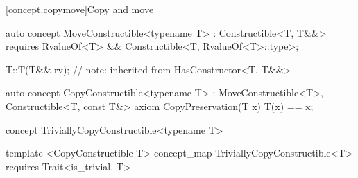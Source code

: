 \documentclass[american,twoside]{book}
\begin{document}
\begin{itemdescr}
\pnum
{}
\end{itemdescr}

[concept.copymove]{Copy and move}
\begin{itemdecl}
auto concept MoveConstructible<typename T> : Constructible<T, T&&> { 
  requires RvalueOf<T> && Constructible<T, RvalueOf<T>::type>;
}
\end{itemdecl}

\begin{itemdescr}
\pnum
{}
\end{itemdescr}

\begin{itemdecl}
T::T(T&& rv); // note: inherited from HasConstructor<T, T\&\&>
\end{itemdecl}

\begin{itemdescr}
\pnum
{}
\end{itemdescr}

\begin{itemdecl}
auto concept CopyConstructible<typename T> : MoveConstructible<T>, Constructible<T, const T&> {
  axiom CopyPreservation(T x) {
    T(x) == x;
  }
}
\end{itemdecl}

\begin{itemdescr}
\pnum 
{}
\end{itemdescr}

\begin{itemdecl}
concept TriviallyCopyConstructible<typename T> { }


template <CopyConstructible T>
concept_map TriviallyCopyConstructible<T>
requires Trait<is_trivial, T> 
{ }
\end{itemdecl}

\begin{itemdescr}
\pnum 
{}
\end{itemdescr}
\end{document}
